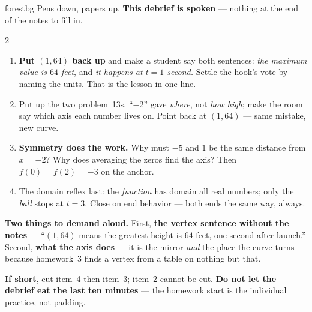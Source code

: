 \documentclass[10pt]{article}
\begin{document}
\boxguard
\begin{skillbox}{forestbg}
Pens down, papers up. \textbf{This debrief is spoken} --- nothing at the end of the notes to fill
in.
\begin{multicols}{2}
\begin{enumerate}[leftmargin=1.3em, nosep, itemsep=3pt]
  \item \textbf{Put $(1,64)$ back up} and make a student say both sentences: \emph{the maximum
        value is $64$ feet}, and \emph{it happens at $t=1$ second.} Settle the hook's vote by
        naming the units. That is the lesson in one line.
  \item Put up the two problem~13s. ``$-2$'' gave \emph{where}, not \emph{how high}; make the room
        say which axis each number lives on. Point back at $(1,64)$ --- same mistake, new curve.
  \item \textbf{Symmetry does the work.} Why must $-5$ and $1$ be the same distance from $x=-2$?
        Why does averaging the zeros find the axis? Then $f(0)=f(2)=-3$ on the anchor.
  \item The domain reflex last: the \emph{function} has domain all real numbers; only the
        \emph{ball} stops at $t=3$. Close on end behavior --- both ends the same way, always.
\end{enumerate}
\columnbreak
\textbf{Two things to demand aloud.} First, \textbf{the vertex sentence without the notes} ---
``$(1,64)$ means the greatest height is $64$ feet, one second after launch.'' Second,
\textbf{what the axis does} --- it is the mirror \emph{and} the place the curve turns --- because
homework~3 finds a vertex from a table on nothing but that.

\textbf{If short}, cut item~4 then item~3; item~2 cannot be cut. \textbf{Do not let the debrief
eat the last ten minutes} --- the homework start is the individual practice, not padding.
\end{multicols}
\end{skillbox}
\end{document}
